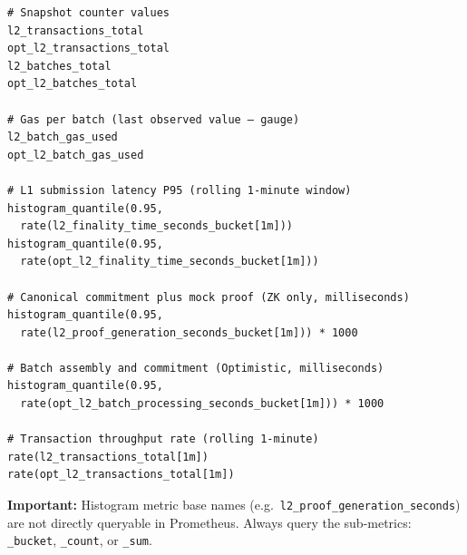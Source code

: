 \begin{listing}[H]
    \begin{verbatim}
# Snapshot counter values
l2_transactions_total
opt_l2_transactions_total
l2_batches_total
opt_l2_batches_total

# Gas per batch (last observed value — gauge)
l2_batch_gas_used
opt_l2_batch_gas_used

# L1 submission latency P95 (rolling 1-minute window)
histogram_quantile(0.95,
  rate(l2_finality_time_seconds_bucket[1m]))
histogram_quantile(0.95,
  rate(opt_l2_finality_time_seconds_bucket[1m]))

# Canonical commitment plus mock proof (ZK only, milliseconds)
histogram_quantile(0.95,
  rate(l2_proof_generation_seconds_bucket[1m])) * 1000

# Batch assembly and commitment (Optimistic, milliseconds)
histogram_quantile(0.95,
  rate(opt_l2_batch_processing_seconds_bucket[1m])) * 1000

# Transaction throughput rate (rolling 1-minute)
rate(l2_transactions_total[1m])
rate(opt_l2_transactions_total[1m])
    \end{verbatim}
    \caption{PromQL queries}
    \label{lst:promql-queries}
\end{listing}

\textbf{Important:} Histogram metric base names (e.g.\ \texttt{l2\_proof\_generation\_seconds}) are not directly queryable in Prometheus. Always query the sub-metrics: \texttt{\_bucket}, \texttt{\_count}, or \texttt{\_sum}.
